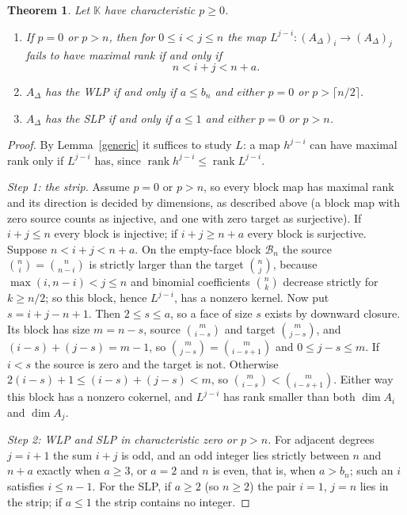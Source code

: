\documentclass[11pt,a4paper]{article}
\newtheorem{theorem}{Theorem}[section]
\theoremstyle{definition}
\newcommand{\kk}{\mathbb K}
\newcommand{\rk}{\operatorname{rank}}
\newcommand{\B}{\mathcal B}
\begin{document}
\begin{theorem}\label{base}
Let $\kk$ have characteristic $p\ge0$.
\begin{enumerate}
\item If $p=0$ or $p>n$, then for $0\le i<j\le n$ the map $L^{j-i}:(A_\Delta)_i\to(A_\Delta)_j$ fails to have maximal rank if and only if
\begin{equation}\label{strip}
 n<i+j<n+a .
\end{equation}
\item $A_\Delta$ has the WLP if and only if $a\le b_n$ and either $p=0$ or $p>\lceil n/2\rceil$.
\item $A_\Delta$ has the SLP if and only if $a\le1$ and either $p=0$ or $p>n$.
\end{enumerate}
\end{theorem}
\begin{proof}
By Lemma~\ref{generic} it suffices to study $L$: a map $h^{j-i}$ can have maximal rank only if $L^{j-i}$ has, since $\rk h^{j-i}\le\rk L^{j-i}$.

\emph{Step 1: the strip.} Assume $p=0$ or $p>n$, so every block map has maximal rank and its direction is decided by dimensions, as described above (a block map with zero source counts as injective, and one with zero target as surjective). If $i+j\le n$ every block is injective; if $i+j\ge n+a$ every block is surjective. Suppose $n<i+j<n+a$. On the empty-face block $\B_n$ the source $\binom ni=\binom n{n-i}$ is strictly larger than the target $\binom nj$, because $\max(i,n-i)<j\le n$ and binomial coefficients $\binom nk$ decrease strictly for $k\ge n/2$; so this block, hence $L^{j-i}$, has a nonzero kernel. Now put $s=i+j-n+1$. Then $2\le s\le a$, so a face of size $s$ exists by downward closure. Its block has size $m=n-s$, source $\binom{m}{i-s}$ and target $\binom{m}{j-s}$, and $(i-s)+(j-s)=m-1$, so $\binom m{j-s}=\binom m{i-s+1}$ and $0\le j-s\le m$. If $i<s$ the source is zero and the target is not. Otherwise $2(i-s)+1\le(i-s)+(j-s)<m$, so $\binom m{i-s}<\binom m{i-s+1}$. Either way this block has a nonzero cokernel, and $L^{j-i}$ has rank smaller than both $\dim A_i$ and $\dim A_j$.

\emph{Step 2: WLP and SLP in characteristic zero or $p>n$.} For adjacent degrees $j=i+1$ the sum $i+j$ is odd, and an odd integer lies strictly between $n$ and $n+a$ exactly when $a\ge3$, or $a=2$ and $n$ is even, that is, when $a>b_n$; such an $i$ satisfies $i\le n-1$. For the SLP, if $a\ge2$ (so $n\ge2$) the pair $i=1$, $j=n$ lies in the strip; if $a\le1$ the strip contains no integer.


\end{proof}
\end{document}
